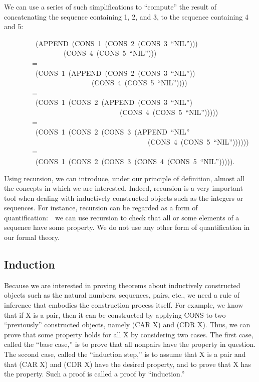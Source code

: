 \documentclass[10pt]{book}
\newenvironment{pubasis}{\begin{flushleft}}{\end{flushleft}}
\begin{document}
We can use a series of such simplifications to ``compute'' the result
of concatenating the sequence containing 1, 2, and 3, to the
sequence containing 4 and 5:
\begin{pubasis}
~~~~~~~~~(APPEND~(CONS~1~(CONS~2~(CONS~3~``NIL'')))\\
~~~~~~~~~~~~~~~~~(CONS~4~(CONS~5~``NIL'')))\\
~~~~~~~~=\\
~~~~~~~~~(CONS~1~(APPEND~(CONS~2~(CONS~3~``NIL''))\\
~~~~~~~~~~~~~~~~~~~~~~~~~(CONS~4~(CONS~5~``NIL''))))\\
~~~~~~~~=\\
~~~~~~~~~(CONS~1~(CONS~2~(APPEND~(CONS~3~``NIL'')\\
~~~~~~~~~~~~~~~~~~~~~~~~~~~~~~~~~(CONS~4~(CONS~5~``NIL'')))))\\
~~~~~~~~=\\
~~~~~~~~~(CONS~1~(CONS~2~(CONS~3~(APPEND~``NIL''\\
~~~~~~~~~~~~~~~~~~~~~~~~~~~~~~~~~~~~~~~~~(CONS~4~(CONS~5~``NIL''))))))\\
~~~~~~~~=\\
~~~~~~~~~(CONS~1~(CONS~2~(CONS~3~(CONS~4~(CONS~5~``NIL''))))).\\
\end{pubasis}
Using recursion, we can introduce, under our principle of definition,
almost all the concepts in which we are interested.  Indeed, recursion is
a very important tool when dealing with inductively constructed objects
such as the integers or sequences.  For instance, recursion can be regarded
as a form of quantification:~~we can use recursion to check that all or
some elements of a sequence have some property.
We do not use any
other form of quantification in our formal theory.

\subsection{Induction}
Because we are interested in proving theorems about inductively constructed
objects such as the natural numbers, sequences, pairs, etc.,
we need a rule of inference that embodies the construction
process itself.  For example, we know that if X is a pair, then it can be constructed
by applying CONS to two ``previously'' constructed objects, namely (CAR X) and (CDR X).
Thus,  we can prove that some property
holds for all X by considering two cases.  The first case, called the
``base case,'' is to prove that all nonpairs have the property in question.
The second case, called the ``induction step,'' is to assume that X is
a pair and that (CAR X) and (CDR X) have the desired property, and
to prove that X has the property.  Such a proof is called a proof by ``induction.''
\end{document}
